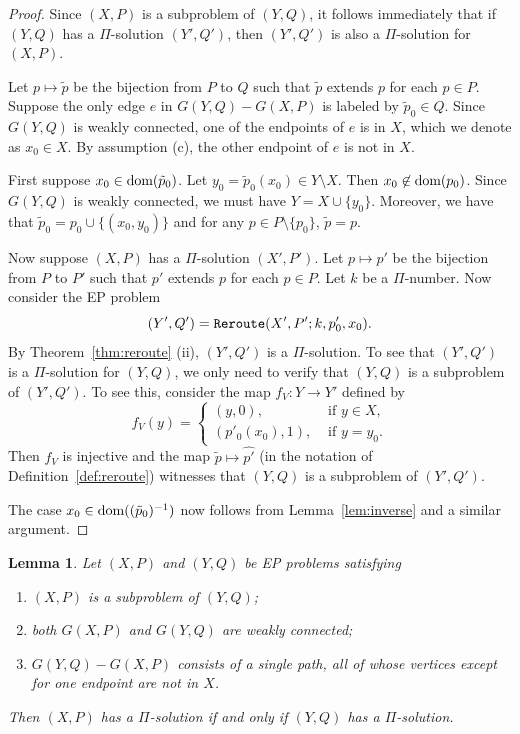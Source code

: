 \documentclass[11pt]{amsart}
\newtheorem{lemma}[theorem]{Lemma}
\theoremstyle{definition}
\newcommand{\dom}{{\mbox{\rm dom}}}
\theoremstyle{definition}
\numberwithin{equation}{section}
\begin{document}
\begin{proof} Since $(X, P)$ is a subproblem of $(Y, Q)$, it follows immediately that if $(Y, Q)$ has a $\Pi$-solution $(Y', Q')$, then $(Y', Q')$ is also a $\Pi$-solution for $(X, P)$. 

Let $p\mapsto \tilde{p}$ be the bijection from $P$ to $Q$ such that $\tilde{p}$ extends $p$ for each $p\in P$. Suppose the only edge $e$ in $G(Y, Q)-G(X, P)$ is labeled by $\tilde{p}_0\in Q$. Since $G(Y, Q)$ is weakly connected, one of the endpoints of $e$ is in $X$, which we denote as $x_0\in X$. By assumption (c), the other endpoint of $e$ is not in $X$. 

First suppose $x_0\in \mbox{\rm dom}(\tilde{p}_0)$. Let $y_0=\tilde{p}_0(x_0)\in Y\setminus X$. Then $x_0\not\in \dom(p_0)$.  Since $G(Y, Q)$ is weakly connected, we must have $Y=X\cup\{y_0\}$. Moreover, we have that $\tilde{p}_0=p_0\cup\{(x_0, y_0)\}$ and for any $p\in P\setminus\{p_0\}$, $\tilde{p}=p$.

Now suppose $(X, P)$ has a $\Pi$-solution $(X', P')$. Let $p\mapsto p'$ be the bijection from $P$ to $P'$ such that $p'$ extends $p$ for each $p\in P$. Let $k$ be a $\Pi$-number. Now consider the EP problem 
$$ (Y', Q')=\mbox{\tt Reroute}(X', P'; k, p'_0, x_0). $$
By Theorem~\ref{thm:reroute} (ii), $(Y', Q')$ is a $\Pi$-solution. To see that $(Y', Q')$ is a $\Pi$-solution for $(Y, Q)$, we only need to verify that $(Y, Q)$ is a subproblem of $(Y', Q')$. To see this, consider the map $f_V\colon Y\to Y'$ defined by
$$ f_V(y)=\left\{\begin{array}{ll} (y, 0), & \mbox{ if $y\in X$,} \\ (p'_0(x_0), 1), & \mbox{ if $y=y_0$.}\end{array}\right. $$
Then $f_V$ is injective and the map $\tilde{p}\mapsto \widehat{p'}$ (in the notation of Definition~\ref{def:reroute}) witnesses that $(Y, Q)$ is a subproblem of $(Y', Q')$.

The case $x_0\in \dom((\tilde{p}_0)^{-1})$ now follows from Lemma~\ref{lem:inverse} and a similar argument.
\end{proof}

\begin{lemma}\label{lem:singlepathextension} Let $(X, P)$ and $(Y, Q)$ be EP problems satisfying
\begin{enumerate}
\item[\rm (a)] $(X, P)$ is a subproblem of $(Y, Q)$; 
\item[\rm (b)] both $G(X, P)$ and $G(Y, Q)$ are weakly connected;
\item[\rm (c)] $G(Y, Q)-G(X, P)$ consists of a single path, all of whose vertices except for one endpoint are not in $X$.
\end{enumerate}
Then $(X, P)$ has a $\Pi$-solution if and only if $(Y, Q)$ has a $\Pi$-solution.
\end{lemma}
\end{document}
